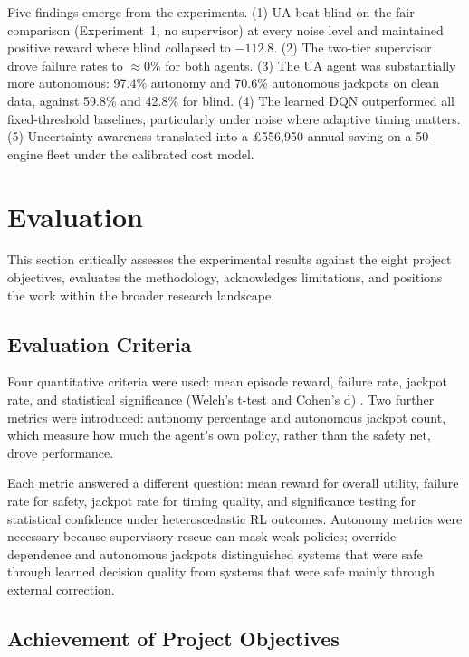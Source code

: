 \documentclass[12pt,a4paper]{report}
\begin{document}
Five findings emerge from the experiments. (1) UA beat blind on the fair comparison (Experiment~1, no supervisor) at every noise level and maintained positive reward where blind collapsed to $-112.8$. (2) The two-tier supervisor drove failure rates to $\approx$0\% for both agents. (3) The UA agent was substantially more autonomous: 97.4\% autonomy and 70.6\% autonomous jackpots on clean data, against 59.8\% and 42.8\% for blind. (4) The learned DQN outperformed all fixed-threshold baselines, particularly under noise where adaptive timing matters. (5) Uncertainty awareness translated into a \pounds556,950 annual saving on a 50-engine fleet under the calibrated cost model.

\section{Evaluation}

This section critically assesses the experimental results against the eight project objectives, evaluates the methodology, acknowledges limitations, and positions the work within the broader research landscape.

\subsection{Evaluation Criteria}

Four quantitative criteria were used: mean episode reward, failure rate, jackpot rate, and statistical significance (Welch's t-test and Cohen's d) \citep{cohen1988statistical}. Two further metrics were introduced: autonomy percentage and autonomous jackpot count, which measure how much the agent's own policy, rather than the safety net, drove performance.


Each metric answered a different question: mean reward for overall utility, failure rate for safety, jackpot rate for timing quality, and significance testing for statistical confidence under heteroscedastic RL outcomes. Autonomy metrics were necessary because supervisory rescue can mask weak policies; override dependence and autonomous jackpots distinguished systems that were safe through learned decision quality from systems that were safe mainly through external correction.

\subsection{Achievement of Project Objectives}
\end{document}
